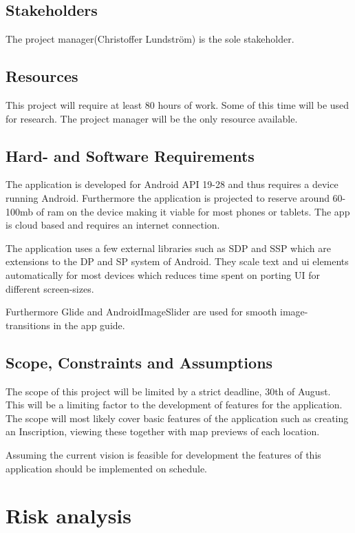\documentclass[]{article}
\begin{document}
\begin{flushleft}
\subsection{Stakeholders}
The project manager(Christoffer Lundström) is the sole stakeholder.

\subsection{Resources}
This project will require at least 80 hours of work. Some of this time will be used for research. The project manager will be the only resource available.

\subsection{Hard- and Software Requirements}
The application is developed for Android API 19-28 and thus requires a device running Android.
Furthermore the application is projected to reserve around 60-100mb of ram on the device making it viable for most phones or tablets. The app is cloud based and requires an internet connection.\medskip

The application uses a few external libraries such as SDP\parencite{sdp} and SSP\parencite{ssp} which are extensions to the DP and SP system of Android. They scale text and ui elements automatically for most devices which reduces time spent on porting UI for different screen-sizes.\medskip

Furthermore Glide\parencite{glide:1} and AndroidImageSlider\parencite{slider:1} are used for smooth image-transitions in the app guide.

\subsection{Scope, Constraints and Assumptions}

The scope of this project will be limited by a strict deadline, 30th of August. This will be a limiting factor to the development of features for the application. The scope will most likely cover basic features of the application such as creating an Inscription, viewing these together with map previews of each location.\smallskip

Assuming the current vision is feasible for development the features of this application should be implemented on schedule.



\section{Risk analysis}


\end{flushleft}
\end{document}
